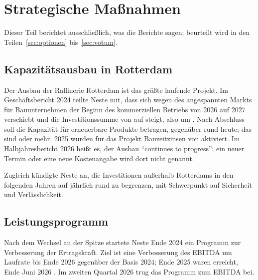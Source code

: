\section{Strategische Ma{\ss}nahmen}
\label{sec:strategie}

Dieser Teil berichtet ausschlie{\ss}lich, was die Berichte sagen; beurteilt wird in den
Teilen~\ref{sec:optionen} bis~\ref{sec:votum}.

\subsection{Kapazit\"atsausbau in Rotterdam}

Der Ausbau der Raffinerie Rotterdam ist das gr\"o{\ss}te laufende Projekt. Im
Gesch\"aftsbericht 2024 teilte Neste mit, dass sich wegen des angespannten Markts f\"ur
Bauunternehmen der Beginn des kommerziellen Betriebs von 2026 auf 2027 verschiebt und die
Investitionssumme von  auf 
steigt, also um \RotterdamMehrkosten. Nach Abschluss soll die Kapazit\"at f\"ur
erneuerbare Produkte  betragen, gegen\"uber rund
 heute; das sind  oder
\KapazitaetPlusPz{} mehr. 2025 wurden f\"ur das Projekt Bauzeitzinsen von
 aktiviert. Im Halbjahresbericht 2026 hei{\ss}t es,
der Ausbau \enquote{continues to progress}; ein neuer Termin oder eine neue Kostenangabe
wird dort nicht genannt.

Zugleich k\"undigte Neste an, die Investitionen au{\ss}erhalb Rotterdams in den folgenden
Jahren auf j\"ahrlich rund  zu begrenzen, mit Schwerpunkt
auf Sicherheit und Verl\"asslichkeit.

\subsection{Leistungsprogramm}

Nach dem Wechsel an der Spitze startete Neste Ende 2024 ein Programm zur Verbesserung der
Ertragskraft. Ziel ist eine Verbesserung des EBITDA um  Laufrate bis
Ende 2026 gegen\"uber der Basis 2024; Ende 2025 waren 
erreicht, Ende Juni 2026 . Im zweiten Quartal
2026 trug das Programm  zum EBITDA bei.


